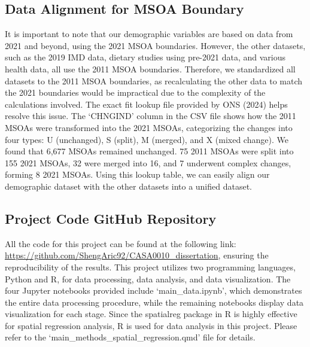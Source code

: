 \subsection{Data Alignment for MSOA Boundary}
\label{sec:3.2.5}
It is important to note that our demographic variables are based on data from 2021 and beyond, using the 2021 MSOA boundaries. However, the other datasets, such as the 2019 IMD data, dietary studies using pre-2021 data, and various health data, all use the 2011 MSOA boundaries. Therefore, we standardized all datasets to the 2011 MSOA boundaries, as recalculating the other data to match the 2021 boundaries would be impractical due to the complexity of the calculations involved. The exact fit lookup file provided by ONS (2024) helps resolve this issue. The `CHNGIND’ column in the CSV file shows how the 2011 MSOAs were transformed into the 2021 MSOAs, categorizing the changes into four types: U (unchanged), S (split), M (merged), and X (mixed change). We found that 6,677 MSOAs remained unchanged. 75 2011 MSOAs were split into 155 2021 MSOAs, 32 were merged into 16, and 7 underwent complex changes, forming 8 2021 MSOAs. Using this lookup table, we can easily align our demographic dataset with the other datasets into a unified dataset.


\subsection{Project Code GitHub Repository}
\label{sec:3.2.6}
All the code for this project can be found at the following link: \url{https://github.com/ShengAric92/CASA0010_dissertation}, ensuring the reproducibility of the results. This project utilizes two programming languages, Python and R, for data processing, data analysis, and data visualization. The four Jupyter notebooks provided include `main\_data.ipynb', which demonstrates the entire data processing procedure, while the remaining notebooks display data visualization for each stage. Since the spatialreg package in R is highly effective for spatial regression analysis, R is used for data analysis in this project. Please refer to the `main\_methods\_spatial\_regression.qmd' file for details.


